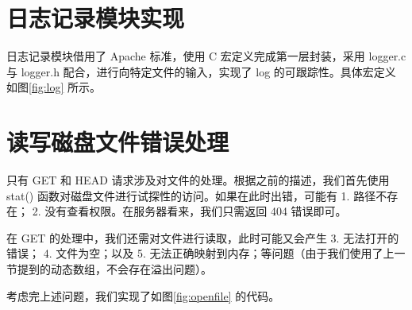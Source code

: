 \section{日志记录模块实现}
日志记录模块借用了 Apache 标准，使用 C 宏定义完成第一层封装，采用 logger.c 与 logger.h 配合，进行向特定文件的输入，实现了 log 的可跟踪性。具体宏定义如图\ref{fig:log} 所示。

\section{读写磁盘文件错误处理}
只有 GET 和 HEAD 请求涉及对文件的处理。根据之前的描述，我们首先使用 stat() 函数对磁盘文件进行试探性的访问。如果在此时出错，可能有 1. 路径不存在； 2. 没有查看权限。在服务器看来，我们只需返回 404 错误即可。

在 GET 的处理中，我们还需对文件进行读取，此时可能又会产生 3. 无法打开的错误； 4. 文件为空；以及 5. 无法正确映射到内存；等问题（由于我们使用了上一节提到的动态数组，不会存在溢出问题）。

考虑完上述问题，我们实现了如图\ref{fig:openfile} 的代码。

